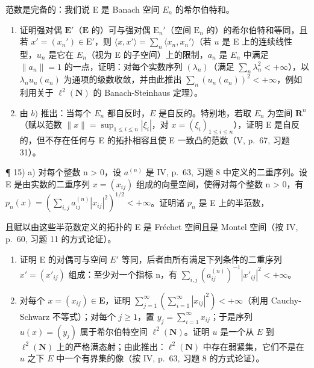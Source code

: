 范数是完备的：我们说 E 是 Banach 空间 \(E_{n}\) 的希尔伯特和。

\begin{enumerate}
\def\labelenumi{\alph{enumi})}
\setcounter{enumi}{1}
\item
  证明强对偶 \(\mathbf{E}'\)（\(\mathbf{E}\) 的）可与强对偶 \(\mathrm{E}_n'\)（空间 \(\mathrm{E}_n\) 的）的希尔伯特和等同，且若 \(x' = (x_n') \in \mathrm{E}'\)，则 \(\langle x, x' \rangle = \sum_{n} \langle x_n, x_n' \rangle\)（若 \(u\) 是 E 上的连续线性型，\(u_{n}\) 是它在 \(E_{n}\)（视为 E 的子空间）上的限制，\(a_{n}\) 是 \(E_{n}\) 中满足 \(\|a_{n}\|=1\) 的一点，证明：对每个实数序列 \((\lambda_{n})\)（满足 \(\sum_{n}\lambda_{n}^{2}<+\infty\)），以 \(\lambda_{n}u_{n}(a_{n})\) 为通项的级数收敛，并由此推出 \(\sum_{n}(u_{n}(a_{n}))^{2}<+\infty\)，例如利用关于 \(\ell^{2}(\mathbf{N})\) 的 Banach-Steinhaus 定理）。
\item
  由 \(b)\) 推出：当每个 \(E_n\) 都自反时，\(E\) 是自反的。特别地，若取 \(E_n\) 为空间 \(\mathbf{R}^n\)（赋以范数 \(\| x \| = \sup_{1 \leqslant i \leqslant n} |\xi_i|\)，对 \(x = (\xi_i)_{1 \leqslant i \leqslant n}\)），证明 E 是自反的，但不存在任何与 E 的拓扑相容且使 E 一致凸的范数（V, p.~67, 习题 31）。
\end{enumerate}

¶ 15) a) 对每个整数 n \textgreater{} 0，设 \(a^{(n)}\) 是 IV, p.~63, 习题 8 中定义的二重序列。设 E 是由实数的二重序列 \(x = (x_{ij})\) 组成的向量空间，使得对每个整数 n \textgreater{} 0，有 \(p_n(x) = (\sum_{i,j} a_{ij}^{(n)} |x_{ij}|^2)^{1/2} < +\infty\)。证明诸 \(p_n\) 是 E 上的半范数，

且赋以由这些半范数定义的拓扑的 E 是 Fréchet 空间且是 Montel 空间（按 IV, p.~60, 习题 11 的方式论证）。

\begin{enumerate}
\def\labelenumi{\alph{enumi})}
\setcounter{enumi}{1}
\item
  证明 E 的对偶可与空间 \(E'\) 等同，后者由所有满足下列条件的二重序列 \(x' = (x'_{ij})\) 组成：至少对一个指标 n，有 \(\sum_{i,j} (a_{ij}^{(n)})^{-1} |x'_{ij}|^2 < +\infty\)。
\item
  对每个 \(x = (x_{ij}) \in \mathbf{E}\)，证明 \(\sum_{j=1}^{\infty} \left( \sum_{i=1}^{\infty} |x_{ij}|^2 \right) < +\infty\)（利用 Cauchy-Schwarz 不等式）；对每个 \(j \geqslant 1\)，置 \(y_j = \sum_{i=1}^{\infty} x_{ij}\)；于是序列 \(u(x) = (y_j)\) 属于希尔伯特空间 \(\ell^2(\mathbf{N})\)。证明 \(u\) 是一个从 \(E\) 到 \(\ell^2(\mathbf{N})\) 上的严格满态射；由此推出：\(\ell^2(\mathbf{N})\) 中存在弱紧集，它们不是在 \(u\) 之下 \(E\) 中一个有界集的像（按 IV, p.~63, 习题 8 的方式论证）。
\end{enumerate}

